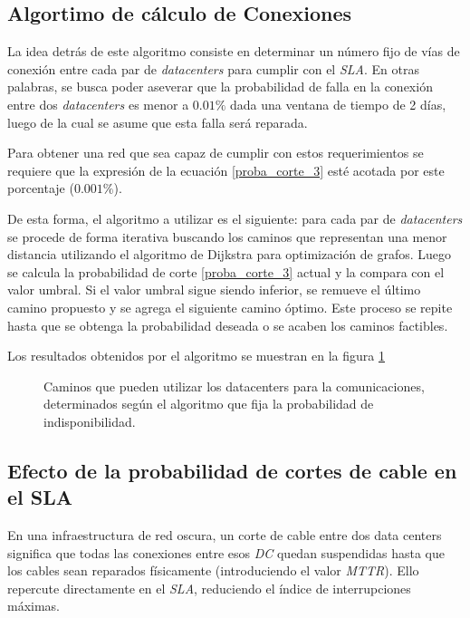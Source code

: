 \subsection{Algortimo de cálculo de Conexiones}
\label{sec:algoritmo_conex}

La idea detrás de este algoritmo consiste en determinar un número fijo 
de vías de conexión entre cada par de \emph{datacenters} para cumplir 
con el \emph{SLA}. En otras palabras, se busca poder aseverar que la 
probabilidad de falla en la conexión entre dos \emph{datacenters} es 
menor a $0.01 \%$ dada una ventana de tiempo de 2 días, luego de la cual
se asume que esta falla será reparada.

Para obtener una red que sea capaz de cumplir con estos requerimientos 
se requiere que la expresión de la ecuación \eqref{proba_corte_3} esté 
acotada por este porcentaje ($0.001\%$). 

De esta forma, el algoritmo a utilizar es el siguiente: para cada par 
de \emph{datacenters} se procede de forma iterativa buscando los caminos 
que representan una menor distancia utilizando el algoritmo de Dijkstra
para optimización de grafos. Luego se calcula la probabilidad de corte 
\eqref{proba_corte_3} actual y la compara con el valor umbral. Si el 
valor umbral sigue siendo inferior, se remueve el último camino propuesto 
y se agrega el siguiente camino óptimo. Este proceso se repite hasta que 
se obtenga la probabilidad deseada o se acaben los caminos factibles.

Los resultados obtenidos por el algoritmo se muestran en la figura
\ref{fig:caminos}

\begin{figure}[H]
  \centering
  \caption{Caminos que pueden utilizar los datacenters para la comunicaciones, determinados según el algoritmo que fija la probabilidad de indisponibilidad.}
  \label{fig:caminos}
\end{figure}


\subsection{Efecto de la probabilidad de cortes de cable en el SLA}
\label{sec:cortes}

En una infraestructura de red oscura, un corte de cable entre dos data
centers significa que todas las conexiones entre esos \emph{DC} quedan
suspendidas hasta que los cables sean reparados físicamente
(introduciendo el valor \emph{MTTR}). Ello repercute directamente en
el \emph{SLA}, reduciendo el índice de interrupciones máximas.

